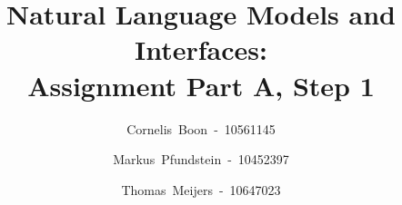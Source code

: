 \documentclass[final,12pt]{elsarticle}
\begin{document}
\makeatletter
\long{}
\makeatother

\makeatletter
\def\ps@pprintTitle{%
  \let\@oddhead\@empty
  \let\@evenhead\@empty
  \def\@oddfoot{\reset@font\hfil\thepage\hfil}
  \let\@evenfoot\@oddfoot
}
\makeatother

\begin{frontmatter}
\title{Natural Language Models and Interfaces: \\ Assignment Part A, Step 1}
\author{Cornelis~Boon~-~10561145} 
\author{Markus~Pfundstein~-~10452397}
\author{Thomas~Meijers~-~10647023}

\begin{abstract}
\end{abstract}
\end{frontmatter}
\newpage


\end{document}
